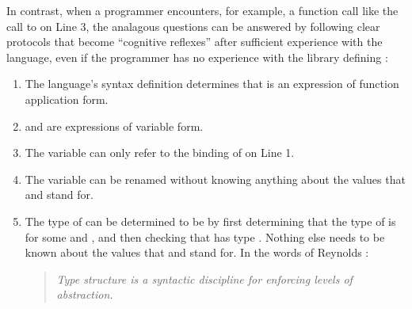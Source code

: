 
In contrast, when a programmer encounters, for example, a function call like the call to  on Line 3, the analagous questions can be answered by following clear protocols that become ``cognitive reflexes'' after sufficient experience with the language, even if the programmer has no experience with the library defining :
\begin{enumerate}
\item The language's syntax definition determines that  is an expression of function application form.
\item {} and  are expressions of variable form.
\item The variable  can only refer to the binding of  on Line 1.
\item The variable  can be renamed without knowing anything about the values that  and  stand for.
\item The type of  can be determined to be  by first determining that the type of  is  for some  and , and then checking that  has type . Nothing else needs to be known about the values that  and  stand for. In the words of Reynolds \cite{B304}:
\begin{quote}
\emph{Type structure is a syntactic discipline for enforcing levels of abstraction.}
\end{quote}
\end{enumerate}



